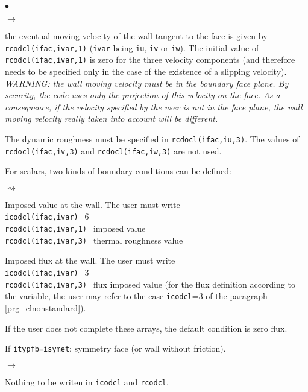 {{{\begin{list}{$\bullet$}{}
\begin{list}{$\rightarrow$}{}
\item the eventual moving velocity of the wall tangent to the face is
      given by \texttt{rcodcl(ifac,ivar,1)} (\texttt{ivar} being
      \texttt{iu}, \texttt{iv} or \texttt{iw}). The initial
      value of \texttt{rcodcl(ifac,ivar,1)} is zero for
      the three velocity components (and therefore needs to be specified
      only in the case of the existence of a slipping velocity). \\
{\em WARNING: the wall moving velocity must be in the boundary face
      plane. By security, the code uses only the projection of this
      velocity on the face. As a consequence, if the velocity specified
      by the user is not in the face plane, the wall moving velocity really
      taken into account will be different.}
\item The dynamic roughness must be specified in \texttt{rcdocl(ifac,iu,3)}.
      The values of \texttt{rcdocl(ifac,iv,3)} and
      \texttt{rcdocl(ifac,iw,3)} are not used.
\item For scalars, two kinds of boundary conditions can be defined:
\begin{list}{$\rightsquigarrow$}{}
\item Imposed value at the wall. The user must write\\
\hspace*{1cm}\texttt{icodcl(ifac,ivar)}=6\\
\hspace*{1cm}\texttt{rcodcl(ifac,ivar,1)}=imposed value\\
\hspace*{1cm}\texttt{rcodcl(ifac,ivar,3)}=thermal roughness value\\
\item Imposed flux at the wall. The user must write\\
\hspace*{1cm}\texttt{icodcl(ifac,ivar)}=3\\
\hspace*{1cm}\texttt{rcodcl(ifac,ivar,3)}=flux imposed value (for the flux
      definition according to the variable, the user may refer to the
      case \texttt{icodcl}=3 of the paragraph \ref{prg_clnonstandard}).
\item If the user does not complete these arrays, the default condition
      is zero flux.
\end{list}
\end{list}
\item If \texttt{itypfb=isymet}: symmetry face (or wall without friction).
\begin{list}{$\rightarrow$}{}
\item Nothing to be writen in \texttt{icodcl} and  \texttt{rcodcl}.
\end{list}


\end{list}}}}
